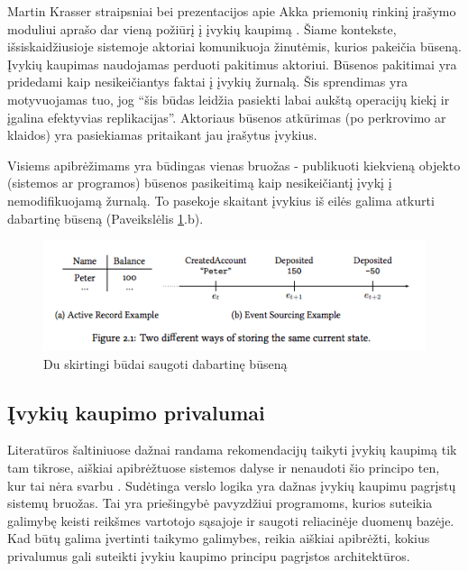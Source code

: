 Martin Krasser straipsniai bei prezentacijos apie Akka priemonių rinkinį įrašymo moduliui aprašo dar vieną požiūrį į įvykių kaupimą \cite{Krasser:AkkaPersistence, Krasser:AkkaYoutube}. Šiame kontekste, išsiskaidžiusioje sistemoje aktoriai komunikuoja žinutėmis, kurios pakeičia būseną. Įvykių kaupimas naudojamas perduoti pakitimus aktoriui. Būsenos pakitimai yra pridedami kaip nesikeičiantys faktai į įvykių žurnalą. Šis sprendimas yra motyvuojamas tuo, jog “šis būdas leidžia pasiekti labai aukštą operacijų kiekį ir įgalina efektyvias replikacijas”. Aktoriaus būsenos atkūrimas (po perkrovimo ar klaidos) yra pasiekiamas pritaikant jau įrašytus įvykius.

Visiems apibrėžimams yra būdingas vienas bruožas - publikuoti kiekvieną objekto (sistemos ar programos) būsenos pasikeitimą kaip nesikeičiantį įvykį į nemodifikuojamą žurnalą. To pasekoje skaitant įvykius iš eilės galima atkurti dabartinę būseną (Paveikslėlis \ref{img:current_state}.b).

\begin{figure}[H]
    \centering
    \includegraphics[scale=0.8]{img/current_state}
    \caption{Du skirtingi būdai saugoti dabartinę būseną}
    \label{img:current_state}
\end{figure}

\subsection{Įvykių kaupimo privalumai}

Literatūros šaltiniuose dažnai randama rekomendacijų taikyti įvykių kaupimą tik tam tikrose, aiškiai apibrėžtuose sistemos dalyse ir nenaudoti šio principo ten, kur tai nėra svarbu \cite{Betts:2013:ECE:2509680}. Sudėtinga verslo logika yra dažnas įvykių kaupimu pagrįstų sistemų bruožas. Tai yra priešingybė pavyzdžiui programoms, kurios suteikia galimybę keisti reikšmes vartotojo sąsajoje ir saugoti reliacinėje duomenų bazėje. Kad būtų galima įvertinti taikymo galimybes, reikia aiškiai apibrėžti, kokius privalumus gali suteikti įvykiu kaupimo principu pagrįstos architektūros.

